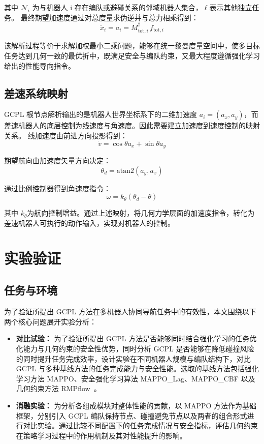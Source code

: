 其中 $\mathcal{N}_i$ 为与机器人 i 存在编队或避碰关系的邻域机器人集合，$\ell$表示其他独立任务。
最终期望加速度通过对总度量求伪逆并与总力相乘得到：
\begin{equation}
    \ddot x_i = a_i = M_{\text{tot},i}^{\dagger}\, f_{\text{tot},i}
\end{equation}
 
该解析过程等价于求解加权最小二乘问题，能够在统一黎曼度量空间中，使多目标任务达到几何一致的最优折中，既满足安全与编队约束，又最大程度遵循强化学习给出的性能导向指令。

\subsection{差速系统映射}

GCPL 根节点解析输出的是机器人世界坐标系下的二维加速度 $a_i = (a_x, a_y)$，而差速机器人的底层控制为线速度与角速度。因此需要建立加速度到速度控制的映射关系。
线加速度由前进方向投影得到：
\begin{equation}
    \dot v = \cos \theta a_x + \sin \theta a_y 
\end{equation}
 
期望航向由加速度矢量方向决定：
\begin{equation}
    \theta_d = \text{atan2}(a_y, a_x)
\end{equation}

通过比例控制器得到角速度指令：
\begin{equation}
    \omega=k_\theta(\theta_d - \theta)
\end{equation}

其中 $k_\theta$为航向控制增益。通过上述映射，将几何力学层面的加速度指令，转化为差速机器人可执行的动作输入，实现对机器人的控制。

\section{实验验证}
\subsection{任务与环境}
为了验证所提出 GCPL 方法在多机器人协同导航任务中的有效性，本文围绕以下两个核心问题展开实验分析：
\begin{itemize}
    \item \textbf{对比试验：}  
    为了验证所提出 GCPL 方法是否能够同时结合强化学习的任务优化能力与几何约束的安全性优势，同时分析 GCPL 是否能够在降低碰撞风险的同时提升任务完成效率，设计实验在不同机器人规模与编队结构下，对比 GCPL 与多种基线方法的任务完成能力与安全性能。选取的基线方法包括强化学习方法 MAPPO、安全强化学习算法 MAPPO\_Lag、MAPPO\_CBF 以及几何约束方法 RMPflow~\cite{cheng2018rmp}。

    \item \textbf{消融实验：}  
    为分析各组成模块对整体性能的贡献，以 MAPPO 方法作为基础框架，分别引入 GCPL 编队保持节点、碰撞避免节点以及两者的组合形式进行对比实验。通过比较不同配置下的任务完成情况与安全指标，评估几何约束在策略学习过程中的作用机制及其对性能提升的影响。
\end{itemize}

